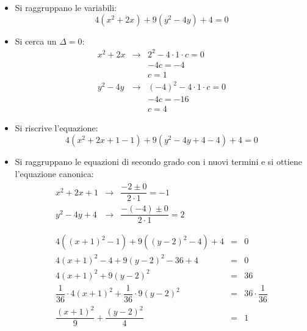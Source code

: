 \documentclass[a4paper]{article}
\begin{document}
	\begin{itemize}
		\item Si raggruppano le variabili:
		\begin{equation*}
			4\left(x^{2} + 2x\right) + 9\left(y^{2} - 4y\right) + 4 = 0
		\end{equation*}

		\item Si cerca un $\Delta = 0$:
		\begin{equation*}
			\begin{array}{rcl}
				x^{2} + 2x &\rightarrow& 2^{2} - 4 \cdot 1 \cdot c = 0 \\ [.3em]
									  && -4c = -4 \\ [.3em]
									  && c = 1 \\ [1em]
				y^{2} - 4y &\rightarrow& \left(-4\right)^{2} - 4 \cdot 1 \cdot c = 0 \\ [.3em]
									  && -4c = -16 \\ [.3em]
									  && c = 4
			\end{array}
		\end{equation*}

		\item Si riscrive l'equazione:
		\begin{equation*}
			4\left(x^{2} + 2x + 1 - 1\right) + 9\left(y^{2} - 4y + 4 - 4\right) + 4 = 0
		\end{equation*}

		\item Si raggruppano le equazioni di secondo grado con i nuovi termini e si ottiene l'equazione canonica:
		\begin{gather*}
			\begin{array}{rcl}
				x^{2} + 2x + 1 &\rightarrow& \dfrac{-2 \pm 0}{2 \cdot 1} = -1 \\ [1em]
				y^{2} - 4y + 4 &\rightarrow& \dfrac{-\left(-4\right) \pm 0}{2 \cdot 1} = 2
			\end{array}
			\\ \\
			\begin{array}{rcl}
				4\left(\left(x+1\right)^{2} - 1\right) + 9\left(\left(y-2\right)^{2} - 4\right) + 4 &=& 0 \\ [1em]
				4\left(x+1\right)^{2} - 4 + 9\left(y-2\right)^{2} - 36 + 4 &=& 0 \\ [1em]
				4\left(x+1\right)^{2} + 9\left(y-2\right)^{2} &=& 36 \\ [1em]
				\dfrac{1}{36} \cdot 4\left(x+1\right)^{2} + \dfrac{1}{36} \cdot 9\left(y-2\right)^{2} &=& 36 \cdot \dfrac{1}{36} \\ [1em]
				\dfrac{\left(x+1\right)^{2}}{9} + \dfrac{\left(y-2\right)^{2}}{4} &=& 1
			\end{array}
		\end{gather*}
	\end{itemize}
\end{document}
